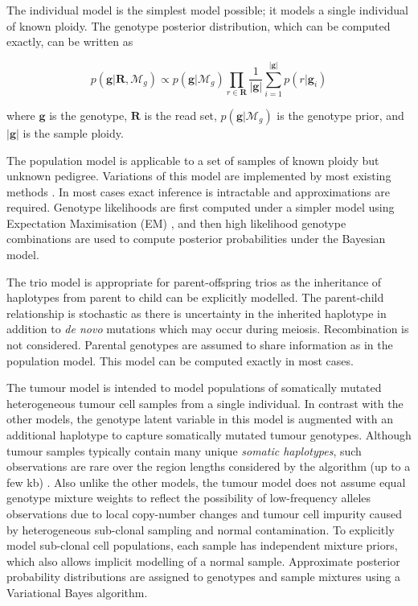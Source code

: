 \documentclass[notitlepage, twocolumn]{article}
\begin{document}
The individual model is the simplest model possible; it models a single individual of known ploidy. The genotype posterior distribution, which can be computed exactly, can be written as

\begin{equation*}
    p(\boldsymbol{g} | \boldsymbol{R}, \mathcal{M}_{g}) \propto p(\boldsymbol{g} | \mathcal{M}_{g}) \prod_{r \in \boldsymbol{R}} \frac{1}{|\boldsymbol{g}|} \sum_{i = 1}^{|\boldsymbol{g}|} p(r | \boldsymbol{g}_i)
\end{equation*}

where $\boldsymbol{g}$ is the genotype, $\boldsymbol{R}$ is the read set, $p(\boldsymbol{g} | \mathcal{M}_{g})$ is the genotype prior, and $|\boldsymbol{g}|$ is the sample ploidy.

The population model is applicable to a set of samples of known ploidy but unknown pedigree. Variations of this model are implemented by most existing methods \cite{RN538, RN141, RN5, RN537}. In most cases exact inference is intractable and approximations are required. Genotype likelihoods are first computed under a simpler model using Expectation Maximisation (EM) \cite{RN5}, and then high likelihood genotype combinations are used to compute posterior probabilities under the Bayesian model.

The trio model is appropriate for parent-offspring trios as the inheritance of haplotypes from parent to child can be explicitly modelled. The parent-child relationship is stochastic as there is uncertainty in the inherited haplotype in addition to \textit{de novo} mutations which may occur during meiosis. Recombination is not considered. Parental genotypes are assumed to share information as in the population model. This model can be computed exactly in most cases.

The tumour model is intended to model populations of somatically mutated heterogeneous tumour cell samples from a single individual. In contrast with the other models, the genotype latent variable in this model is augmented with an additional haplotype to capture somatically mutated tumour genotypes. Although tumour samples typically contain many unique \emph{somatic haplotypes}, such observations are rare over the region lengths considered by the algorithm (up to a few kb) \cite{RN86}. Also unlike the other models, the tumour model does not assume equal genotype mixture weights to reflect the possibility of low-frequency alleles observations due to local copy-number changes and tumour cell impurity caused by heterogeneous sub-clonal sampling and normal contamination. To explicitly model sub-clonal cell populations, each sample has independent mixture priors, which also allows implicit modelling of a normal sample. Approximate posterior probability distributions are assigned to genotypes and sample mixtures using a Variational Bayes algorithm.
\end{document}
